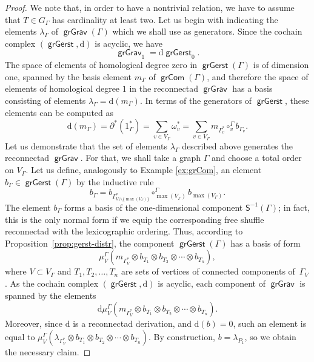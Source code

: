 \documentclass[11pt]{article}
\theoremstyle{definition}
\numberwithin{equation}{section}
\DeclareMathOperator{\grCom}{\mathsf{grCom}}
\DeclareMathOperator{\grGerst}{\mathsf{grGerst}}
\DeclareMathOperator{\grGrav}{\mathsf{grGrav}}
\begin{document}
\begin{proof}
We note that, in order to have a nontrivial relation, we have to assume that $T\in G_\Gamma$ has cardinality at least two. Let us begin with indicating the elements $\lambda_{\Gamma}$ of $\grGrav(\Gamma)$ which we shall use as generators. Since the cochain complex $(\grGerst, \mathrm{d})$ is acyclic, we have 
 \[
\grGrav_1=\mathrm{d}\grGerst_0.
 \] 
The space of elements of homological degree zero in $\grGerst(\Gamma)$ is of dimension one, spanned by the basis element $m_\Gamma$ of $\grCom(\Gamma)$, and therefore the space of elements of homological degree $1$ in the reconnectad $\grGrav$ has a basis consisting of elements $\lambda_{\Gamma}=\mathrm{d}(m_{\Gamma})$. In terms of the generators of $\grGerst$, these elements can be computed as
 \[
\mathrm{d}(m_{\Gamma})=\partial^{*}(1^*_{\Gamma})=\sum_{v\in V_\Gamma} \omega_v^*=\sum_{v\in V_\Gamma} m_{\Gamma^*_v} \circ_v^\Gamma b_{\Gamma_v}.
 \]
Let us demonstrate that the set of elements $\lambda_{\Gamma}$ described above generates the reconnectad $\grGrav$. For that, we shall take a graph $\Gamma$ and choose a total order on $V_\Gamma$. Let us define, analogously to Example \ref{ex:grCom}, an element $b_\Gamma \in \grGerst(\Gamma)$ by the inductive rule 
 \[
b_\Gamma = b_{\Gamma^*_{V_\Gamma\setminus\{\max(V_\Gamma)\}}}\circ_{\max(V_\Gamma)}^{\Gamma} b_{\max(V_\Gamma)}.
 \]
The element $b_\Gamma$ forms a basis of the one-dimensional component $\mathsf{S}^{-1}(\Gamma)$; in fact, this is the only normal form if we equip the corresponding free shuffle reconnectad with the lexicographic ordering. Thus, according to Proposition~\ref{prop:gerst-distr}, the component $\grGerst(\Gamma)$ has a basis of form  
 \[
\mu_V^\Gamma(m_{\Gamma^*_V}\otimes b_{T_1}\otimes b_{T_2}\otimes\cdots\otimes b_{T_n}),
 \]
where $V\subset V_\Gamma$ and $T_1,T_2,\ldots,T_n$ are sets of vertices of connected components of~$\Gamma_V$. As the cochain complex $(\grGerst, \mathrm{d})$ is acyclic, each component of $\grGrav$ is spanned by the elements 
 \[
\mathrm{d}\mu_V^\Gamma(m_{\Gamma^*_V}\otimes b_{T_1}\otimes b_{T_2}\otimes\cdots\otimes b_{T_n}).
 \]
Moreover, since $\mathrm{d}$ is a reconnectad derivation, and $\mathrm{d}(b)=0$, such an element is equal to $\mu_V^\Gamma(\lambda_{\Gamma^*_V}\otimes b_{T_1}\otimes b_{T_2}\otimes\cdots\otimes b_{T_n})$.
By construction, $b=\lambda_{P_1}$, so we obtain the necessary claim. 


\end{proof}
\end{document}
